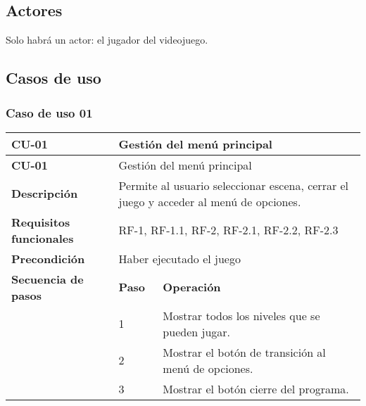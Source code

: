 \subsection{Actores}
Solo habrá un actor: el jugador del videojuego.
\subsection{Casos de uso}

\subsubsection{Caso de uso 01}
\begin{longtable}{lll}
\textbf{CU-01}                                   & \multicolumn{2}{l}{Gestión del menú principal}                                                                                       \\ \hline
\endfirsthead
\textbf{CU-01}                                   & \multicolumn{2}{l}{Gestión del menú principal}                                                                                       \\ \hline
\endhead
%
\textbf{Descripción}                             & \multicolumn{2}{l}{Permite al usuario seleccionar escena, cerrar el juego y acceder al menú de opciones.}                            \\ \hline
\textbf{Requisitos funcionales}                  & \multicolumn{2}{l}{RF-1, RF-1.1, RF-2, RF-2.1, RF-2.2, RF-2.3}                                                                       \\ \hline
\textbf{Precondición}                            & \multicolumn{2}{l}{Haber ejecutado el juego}                                                                                         \\ \hline
\multicolumn{1}{l|}{\textbf{Secuencia de pasos}} & \textbf{Paso}                                  & \textbf{Operación}                                                                  \\ \cline{2-3} 
\multicolumn{1}{l|}{}                            & 1                                              & Mostrar todos los niveles que se pueden jugar.                                      \\
\multicolumn{1}{l|}{}                            & 2                                              & Mostrar el botón de transición al menú de opciones.                                 \\
\multicolumn{1}{l|}{}                            & 3                                              & Mostrar el botón cierre del programa.                                               \\ \hline

\end{longtable}
